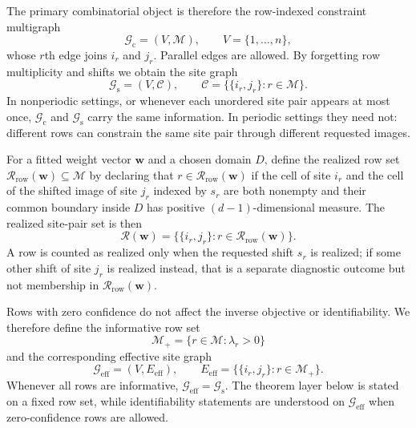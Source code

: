 \documentclass[preprint,12pt]{elsarticle}
\newcommand{\realpairs}{\mathcal{R}}
\newcommand{\candpairs}{\mathcal{C}}
\newcommand{\weights}{\mathbf{w}}
\newcommand{\rowset}{\mathcal{M}}
\newcommand{\cgraph}{\mathcal{G}_{\mathrm{c}}}
\newcommand{\sitegraph}{\mathcal{G}_{\mathrm{s}}}
\newcommand{\effgraph}{\mathcal{G}_{\mathrm{eff}}}
\begin{document}
The primary combinatorial object is therefore the row-indexed constraint
multigraph
\begin{equation}
    \cgraph=(V,\rowset),
    \qquad
    V=\{1,\dots,n\},
\end{equation}
whose $r$th edge joins $i_r$ and $j_r$. Parallel edges are allowed. By
forgetting row multiplicity and shifts we obtain the site graph
\begin{equation}
    \sitegraph=(V,\candpairs),
    \qquad
    \candpairs=\bigl\{\{i_r,j_r\}: r\in\rowset\bigr\}.
\end{equation}
In nonperiodic settings, or whenever each unordered site pair appears at most
once, $\cgraph$ and $\sitegraph$ carry the same information. In periodic
settings they need not: different rows can constrain the same site pair through
different requested images.

For a fitted weight vector $\weights$ and a chosen domain $D$, define the
realized row set $\mathcal{R}_{\mathrm{row}}(\weights)\subseteq\rowset$ by
declaring that $r\in\mathcal{R}_{\mathrm{row}}(\weights)$ if the cell of site
$i_r$ and the cell of the shifted image of site $j_r$ indexed by $s_r$ are both
nonempty and their common boundary inside $D$ has positive $(d-1)$-dimensional
measure. The realized site-pair set is then
\begin{equation}
    \realpairs(\weights)
    =
    \bigl\{\{i_r,j_r\}: r\in\mathcal{R}_{\mathrm{row}}(\weights)\bigr\}.
\end{equation}
A row is counted as realized only when the requested shift $s_r$ is realized;
if some other shift of site $j_r$ is realized instead, that is a separate
diagnostic outcome but not membership in
$\mathcal{R}_{\mathrm{row}}(\weights)$.

Rows with zero confidence do not affect the inverse objective or
identifiability. We therefore define the informative row set
\begin{equation}
    \rowset_+ = \{r\in\rowset : \lambda_r>0\}
\end{equation}
and the corresponding effective site graph
\begin{equation}
    \effgraph=(V,E_{\mathrm{eff}}),
    \qquad
    E_{\mathrm{eff}}=\bigl\{\{i_r,j_r\}: r\in\rowset_+\bigr\}.
\end{equation}
Whenever all rows are informative, $\effgraph=\sitegraph$. The theorem layer
below is stated on a fixed row set, while identifiability statements are
understood on $\effgraph$ when zero-confidence rows are allowed.
\end{document}

